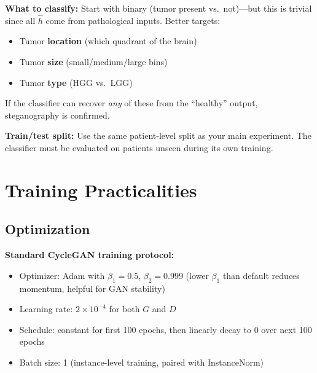 \documentclass[11pt,a4paper]{article}
\theoremstyle{definition}
\begin{document}
\begin{edgecase}
\textbf{What to classify:} Start with binary (tumor present vs.\ not)---but this is trivial since all $\hat{h}$ come from pathological inputs. Better targets:
\begin{itemize}
    \item Tumor \textbf{location} (which quadrant of the brain)
    \item Tumor \textbf{size} (small/medium/large bins)
    \item Tumor \textbf{type} (HGG vs.\ LGG)
\end{itemize}
If the classifier can recover \textit{any} of these from the ``healthy'' output, steganography is confirmed.

\vspace{0.3em}
\textbf{Train/test split:} Use the same patient-level split as your main experiment. The classifier must be evaluated on patients unseen during its own training.
\end{edgecase}

\section{Training Practicalities}

\subsection{Optimization}

\textbf{Standard CycleGAN training protocol:}
\begin{itemize}
    \item Optimizer: Adam with $\beta_1 = 0.5$, $\beta_2 = 0.999$ (lower $\beta_1$ than default reduces momentum, helpful for GAN stability)
    \item Learning rate: $2 \times 10^{-4}$ for both $G$ and $D$
    \item Schedule: constant for first 100 epochs, then linearly decay to 0 over next 100 epochs
    \item Batch size: 1 (instance-level training, paired with InstanceNorm)
\end{itemize}
\end{document}
